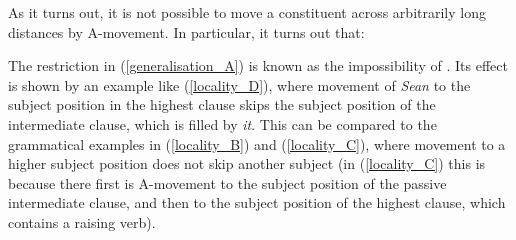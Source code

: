 \documentclass{article}
\begin{document}
As it turns out, it is not possible to move a constituent across arbitrarily long distances by A-movement.
In particular, it turns out that:
\begin{exe}
\end{exe}
The restriction in (\ref{generalisation_A}) is known as the impossibility of .
Its effect is shown by an example like (\ref{locality_D}), where movement of \emph{Sean} to the subject position in the highest clause skips the subject position of the intermediate clause, which is filled by \emph{it}.
This can be compared to the grammatical examples in (\ref{locality_B}) and (\ref{locality_C}), where movement to a higher subject position does not skip another subject (in (\ref{locality_C}) this is because there first is A-movement to the subject position of the passive intermediate clause, and then to the subject position of the highest clause, which contains a raising verb).
\begin{exe}
    \label{locality}
\end{exe}
\end{document}
